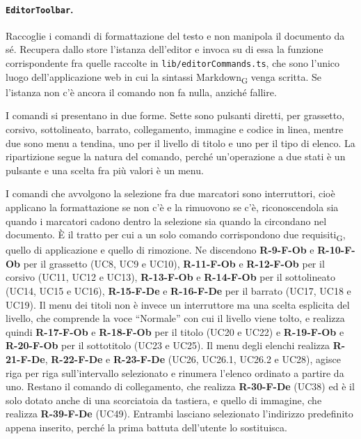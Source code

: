 \documentclass[a4paper, 10pt]{article}
\begin{document}
\paragraph{\texttt{EditorToolbar}.}
Raccoglie i comandi di formattazione del testo e non manipola il documento da sé. Recupera dallo store l'istanza dell'editor e invoca su di essa la funzione corrispondente fra quelle raccolte in \texttt{lib/editorCommands.ts}, che sono l'unico luogo dell'applicazione web in cui la sintassi Markdown\textsubscript{G} venga scritta. Se l'istanza non c'è ancora il comando non fa nulla, anziché fallire.

I comandi si presentano in due forme. Sette sono pulsanti diretti, per grassetto, corsivo, sottolineato, barrato, collegamento, immagine e codice in linea, mentre due sono menu a tendina, uno per il livello di titolo e uno per il tipo di elenco. La ripartizione segue la natura del comando, perché un'operazione a due stati è un pulsante e una scelta fra più valori è un menu.

I comandi che avvolgono la selezione fra due marcatori sono interruttori, cioè applicano la formattazione se non c'è e la rimuovono se c'è, riconoscendola sia quando i marcatori cadono dentro la selezione sia quando la circondano nel documento. È il tratto per cui a un solo comando corrispondono due requisiti\textsubscript{G}, quello di applicazione e quello di rimozione. Ne discendono \textbf{R-9-F-Ob} e \textbf{R-10-F-Ob} per il grassetto (UC8, UC9 e UC10), \textbf{R-11-F-Ob} e \textbf{R-12-F-Ob} per il corsivo (UC11, UC12 e UC13), \textbf{R-13-F-Ob} e \textbf{R-14-F-Ob} per il sottolineato (UC14, UC15 e UC16), \textbf{R-15-F-De} e \textbf{R-16-F-De} per il barrato (UC17, UC18 e UC19). Il menu dei titoli non è invece un interruttore ma una scelta esplicita del livello, che comprende la voce ``Normale'' con cui il livello viene tolto, e realizza quindi \textbf{R-17-F-Ob} e \textbf{R-18-F-Ob} per il titolo (UC20 e UC22) e \textbf{R-19-F-Ob} e \textbf{R-20-F-Ob} per il sottotitolo (UC23 e UC25). Il menu degli elenchi realizza \textbf{R-21-F-De}, \textbf{R-22-F-De} e \textbf{R-23-F-De} (UC26, UC26.1, UC26.2 e UC28), agisce riga per riga sull'intervallo selezionato e rinumera l'elenco ordinato a partire da uno. Restano il comando di collegamento, che realizza \textbf{R-30-F-De} (UC38) ed è il solo dotato anche di una scorciatoia da tastiera, e quello di immagine, che realizza \textbf{R-39-F-De} (UC49). Entrambi lasciano selezionato l'indirizzo predefinito appena inserito, perché la prima battuta dell'utente lo sostituisca.
\end{document}
